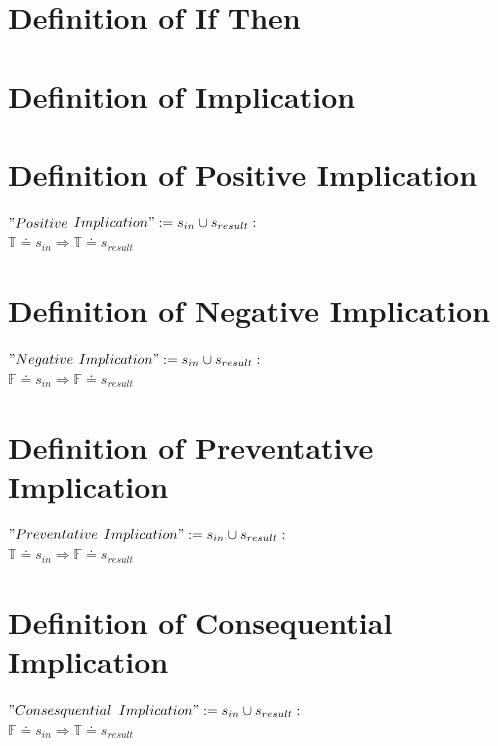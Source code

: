 \documentclass[11pt]{article}
\begin{document}
\section{Definition of If Then}
\section{Definition of Implication}


\section{Definition of Positive Implication}
\begin{center}
$
"Positive$ $Implication" := s_{in} \cup s_{result}:
$
\\ \vspace{2mm}
$
\mathbb{T} \doteq s_{in} \Rightarrow \mathbb{T} \doteq s_{result}
$
\end{center}



\section{Definition of Negative Implication}
\begin{center}
$
"Negative$ $Implication" := s_{in} \cup s_{result}:
$
\\ \vspace{2mm}
$
\mathbb{F} \doteq s_{in} \Rightarrow \mathbb{F} \doteq s_{result}
$
\end{center}




\section{Definition of Preventative Implication}
\begin{center}
$
"Preventative$ $Implication" := s_{in} \cup s_{result}:
$
\\ \vspace{2mm}
$
\mathbb{T} \doteq s_{in} \Rightarrow \mathbb{F} \doteq s_{result}
$
\end{center}



\section{Definition of Consequential Implication}
\begin{center}
$
"Consesquential$ $Implication" := s_{in} \cup s_{result}:
$
\\ \vspace{2mm}
$
\mathbb{F} \doteq s_{in} \Rightarrow \mathbb{T} \doteq s_{result}
$
\end{center}
\end{document}
